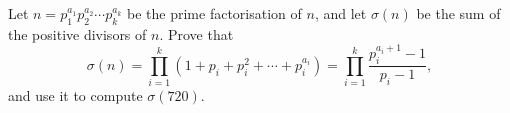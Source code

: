 Let $n=p_1^{a_1}p_2^{a_2}\cdots p_k^{a_k}$ be the prime factorisation of $n$, and let $\sigma(n)$ be the sum of the positive divisors of $n$. Prove that
\[
\sigma(n)=\prod_{i=1}^{k}\left(1+p_i+p_i^2+\cdots+p_i^{a_i}\right)=\prod_{i=1}^k\dfrac{p_i^{a_i+1}-1}{p_i-1},
\]
and use it to compute $\sigma(720)$.
